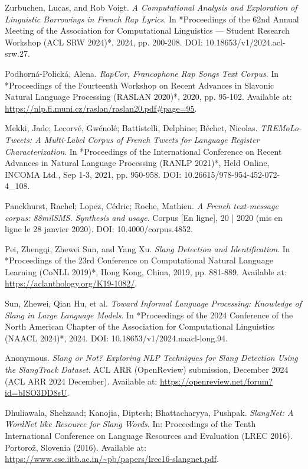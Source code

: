 \documentclass[12pt]{article}
\begin{document}
\begin{thebibliography}{9}
Zurbuchen, Lucas, and Rob Voigt.  
\textit{A Computational Analysis and Exploration of Linguistic Borrowings in French Rap Lyrics}.  
In *Proceedings of the 62nd Annual Meeting of the Association for Computational Linguistics — Student Research Workshop (ACL SRW 2024)*, 2024, pp. 200-208.  
DOI: 10.18653/v1/2024.acl-srw.27.  

Podhorná-Polická, Alena.  
\textit{RapCor, Francophone Rap Songs Text Corpus}.  
In *Proceedings of the Fourteenth Workshop on Recent Advances in Slavonic Natural Language Processing (RASLAN 2020)*, 2020, pp. 95-102.  
Available at: \url{https://nlp.fi.muni.cz/raslan/raslan20.pdf#page=95}.  %

Mekki, Jade; Lecorvé, Gwénolé; Battistelli, Delphine; Béchet, Nicolas.  
\textit{TREMoLo-Tweets: A Multi-Label Corpus of French Tweets for Language Register Characterization}.  
In *Proceedings of the International Conference on Recent Advances in Natural Language Processing (RANLP 2021)*, Held Online, INCOMA Ltd., Sep 1-3, 2021, pp. 950-958.  
DOI: 10.26615/978-954-452-072-4\_108.  

Panckhurst, Rachel; Lopez, Cédric; Roche, Mathieu.  
\textit{A French text-message corpus: 88milSMS. Synthesis and usage}.  
Corpus [En ligne], 20 | 2020 (mis en ligne le 28 janvier 2020).  
DOI: 10.4000/corpus.4852.  

Pei, Zhengqi, Zhewei Sun, and Yang Xu.  
\textit{Slang Detection and Identification}.  
In *Proceedings of the 23rd Conference on Computational Natural Language Learning (CoNLL 2019)*, Hong Kong, China, 2019, pp. 881-889.  
Available at: \url{https://aclanthology.org/K19-1082/}.  %

Sun, Zhewei, Qian Hu, et al.  
\textit{Toward Informal Language Processing: Knowledge of Slang in Large Language Models}.  
In *Proceedings of the 2024 Conference of the North American Chapter of the Association for Computational Linguistics (NAACL 2024)*, 2024.  
DOI: 10.18653/v1/2024.naacl-long.94.  

Anonymous.  
\textit{Slang or Not? Exploring NLP Techniques for Slang Detection Using the SlangTrack Dataset}.  
ACL ARR (OpenReview) submission, December 2024 (ACL ARR 2024 December).  
Available at: \url{https://openreview.net/forum?id=bISO3DD8sU}.

Dhuliawala, Shehzaad; Kanojia, Diptesh; Bhattacharyya, Pushpak.  
\textit{SlangNet: A WordNet like Resource for Slang Words}.  
In: Proceedings of the Tenth International Conference on Language Resources and Evaluation (LREC 2016).  
Portorož, Slovenia (2016).  
Available at: \url{https://www.cse.iitb.ac.in/~pb/papers/lrec16-slangnet.pdf}.


\end{thebibliography}
\end{document}
